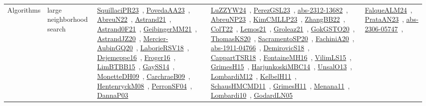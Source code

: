 {\begin{longtable}{lp{3cm}>{\raggedright\arraybackslash}p{6cm}>{\raggedright\arraybackslash}p{6cm}>{\raggedright\arraybackslash}p{8cm}}
Algorithms & large neighborhood search & \href{../works/SquillaciPR23.pdf}{SquillaciPR23}~\cite{SquillaciPR23}, \href{../works/PovedaAA23.pdf}{PovedaAA23}~\cite{PovedaAA23}, \href{../works/AbreuN22.pdf}{AbreuN22}~\cite{AbreuN22}, \href{../works/Astrand21.pdf}{Astrand21}~\cite{Astrand21}, \href{../works/Astrand0F21.pdf}{Astrand0F21}~\cite{Astrand0F21}, \href{../works/GeibingerMM21.pdf}{GeibingerMM21}~\cite{GeibingerMM21}, \href{../works/AstrandJZ20.pdf}{AstrandJZ20}~\cite{AstrandJZ20}, \href{../works/Mercier-AubinGQ20.pdf}{Mercier-AubinGQ20}~\cite{Mercier-AubinGQ20}, \href{../works/LaborieRSV18.pdf}{LaborieRSV18}~\cite{LaborieRSV18}, \href{../works/Dejemeppe16.pdf}{Dejemeppe16}~\cite{Dejemeppe16}, \href{../works/Froger16.pdf}{Froger16}~\cite{Froger16}, \href{../works/LimBTBB15.pdf}{LimBTBB15}~\cite{LimBTBB15}, \href{../works/GaySS14.pdf}{GaySS14}~\cite{GaySS14}, \href{../works/MonetteDH09.pdf}{MonetteDH09}~\cite{MonetteDH09}, \href{../works/CarchraeB09.pdf}{CarchraeB09}~\cite{CarchraeB09}, \href{../works/HentenryckM08.pdf}{HentenryckM08}~\cite{HentenryckM08}, \href{../works/PerronSF04.pdf}{PerronSF04}~\cite{PerronSF04}, \href{../works/DannaP03.pdf}{DannaP03}~\cite{DannaP03} & \href{../works/LuZZYW24.pdf}{LuZZYW24}~\cite{LuZZYW24}, \href{../works/PerezGSL23.pdf}{PerezGSL23}~\cite{PerezGSL23}, \href{../works/abs-2312-13682.pdf}{abs-2312-13682}~\cite{abs-2312-13682}, \href{../works/AbreuNP23.pdf}{AbreuNP23}~\cite{AbreuNP23}, \href{../works/KimCMLLP23.pdf}{KimCMLLP23}~\cite{KimCMLLP23}, \href{../works/ZhangBB22.pdf}{ZhangBB22}~\cite{ZhangBB22}, \href{../works/ColT22.pdf}{ColT22}~\cite{ColT22}, \href{../works/Lemos21.pdf}{Lemos21}~\cite{Lemos21}, \href{../works/Groleaz21.pdf}{Groleaz21}~\cite{Groleaz21}, \href{../works/GokGSTO20.pdf}{GokGSTO20}~\cite{GokGSTO20}, \href{../works/ThomasKS20.pdf}{ThomasKS20}~\cite{ThomasKS20}, \href{../works/SacramentoSP20.pdf}{SacramentoSP20}~\cite{SacramentoSP20}, \href{../works/FachiniA20.pdf}{FachiniA20}~\cite{FachiniA20}, \href{../works/abs-1911-04766.pdf}{abs-1911-04766}~\cite{abs-1911-04766}, \href{../works/DemirovicS18.pdf}{DemirovicS18}~\cite{DemirovicS18}, \href{../works/CappartTSR18.pdf}{CappartTSR18}~\cite{CappartTSR18}, \href{../works/FontaineMH16.pdf}{FontaineMH16}~\cite{FontaineMH16}, \href{../works/VilimLS15.pdf}{VilimLS15}~\cite{VilimLS15}, \href{../works/GrimesH15.pdf}{GrimesH15}~\cite{GrimesH15}, \href{../works/HarjunkoskiMBC14.pdf}{HarjunkoskiMBC14}~\cite{HarjunkoskiMBC14}, \href{../works/UnsalO13.pdf}{UnsalO13}~\cite{UnsalO13}, \href{../works/LombardiM12.pdf}{LombardiM12}~\cite{LombardiM12}, \href{../works/KelbelH11.pdf}{KelbelH11}~\cite{KelbelH11}, \href{../works/SchausHMCMD11.pdf}{SchausHMCMD11}~\cite{SchausHMCMD11}, \href{../works/GrimesH11.pdf}{GrimesH11}~\cite{GrimesH11}, \href{../works/Menana11.pdf}{Menana11}~\cite{Menana11}, \href{../works/Lombardi10.pdf}{Lombardi10}~\cite{Lombardi10}, \href{../works/GodardLN05.pdf}{GodardLN05}~\cite{GodardLN05} & \href{../works/FalqueALM24.pdf}{FalqueALM24}~\cite{FalqueALM24}, \href{../works/PrataAN23.pdf}{PrataAN23}~\cite{PrataAN23}, \href{../works/abs-2306-05747.pdf}{abs-2306-05747}~\cite{abs-2306-05747}, 
\end{longtable}}
